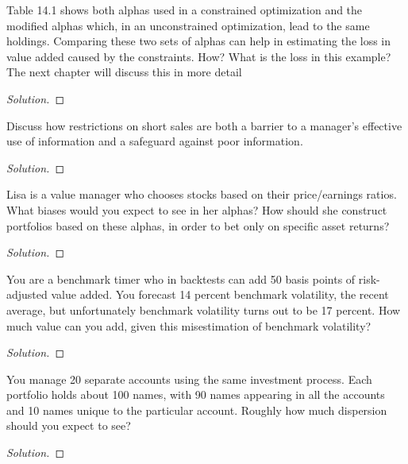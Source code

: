 \begin{problem}{14.1}
  Table 14.1 shows both alphas used in a constrained optimization and the modified alphas which, in an unconstrained optimization, lead to the same holdings. Comparing these two sets of alphas can help in estimating the loss in value added caused by the constraints. How? What is the loss in this example? The next chapter will discuss this in more detail
\end{problem}

\begin{proof}[Solution]
\end{proof}

\begin{problem}{14.2}
  Discuss how restrictions on short sales are both a barrier to a manager's effective use of information and a safeguard against poor information.
\end{problem}

\begin{proof}[Solution]
\end{proof}

\begin{problem}{14.3}
  Lisa is a value manager who chooses stocks based on their price/earnings ratios. What biases would you expect to see in her alphas? How should she construct portfolios based on these alphas, in order to bet only on specific asset returns?
\end{problem}

\begin{proof}[Solution]
\end{proof}

\begin{problem}{14.4}
  You are a benchmark timer who in backtests can add 50 basis points of risk-adjusted value added. You forecast 14 percent benchmark volatility, the recent average, but unfortunately benchmark volatility turns out to be 17 percent. How much value can you add, given this misestimation of benchmark volatility?
\end{problem}

\begin{proof}[Solution]
\end{proof}

\begin{problem}{14.5}
  You manage 20 separate accounts using the same investment process. Each portfolio holds about 100 names, with 90 names appearing in all the accounts and 10 names unique to the particular account. Roughly how much dispersion should you expect to see?
\end{problem}

\begin{proof}[Solution]
\end{proof}
